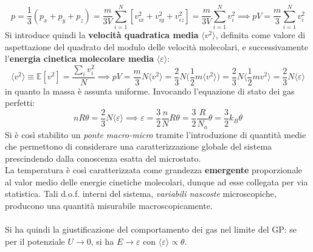 \documentclass[10pt, oneside]{book}
\begin{document}
\[p = \frac{1}{3}(p_x + p_y + p_z) = \frac{m}{3V} \sum\limits_{i=1}^N [v_{ix}^2 + v_{iy}^2 + v_{iz}^2] = \frac{m}{3V} \sum\limits_{i=1}^N v_{i}^2 \implies
pV = \frac{m}{3}\sum\limits_{i=1}^N v_{i}^2\]
Si introduce quindi la \textbf{velocità quadratica media} $\langle v^2 \rangle$, definita come valore di aspettazione del quadrato del modulo delle velocità molecolari,  e successivamente l'\textbf{energia cinetica molecolare media} $\langle \varepsilon \rangle$:
\[\langle v^2 \rangle \equiv \mathbb{E}[v^2] = \frac{\sum_i v_i^2}{N}\implies pV = \frac{m}{3} N \langle v^2 \rangle = \frac{2}{3} N \bigg(\frac{1}{2}m \langle v^2 \rangle\bigg) = \frac{2}{3}N \big\langle \frac{1}{2}mv^2 \big\rangle = \frac{2}{3}N \langle \varepsilon \rangle\]
in quanto la massa è assunta uniforme. Invocando l'equazione di stato dei gas perfetti:
\[nR\theta = \frac{2}{3}N \langle \varepsilon \rangle \implies \varepsilon = \frac{3}{2}\frac{n}{N} R \theta = \frac{3}{2} \frac{R}{N_a}\theta = \frac{3}{2} k_B \theta\]
Si è così stabilito un \textit{ponte macro-micro} tramite l'introduzione di quantità medie che permettono di considerare una caratterizzazione globale del sistema prescindendo dalla conoscenza esatta del microstato.
\\La temperatura è così caratterizzata come grandezza \textbf{emergente} proporzionale al valor medio delle energie cinetiche molecolari, dunque ad esse collegata per via statistica. Tali d.o.f. interni del sistema, \textit{variabili nascoste} microscopiche, producono una quantità misurabile macroscopicamente.
\\~\\Si ha quindi la giustificazione del comportamento dei gas nel limite del GP: se per il potenziale $U \rightarrow 0$, si ha $E \rightarrow \varepsilon$ con $\langle \varepsilon \rangle \propto \theta$.
\end{document}
